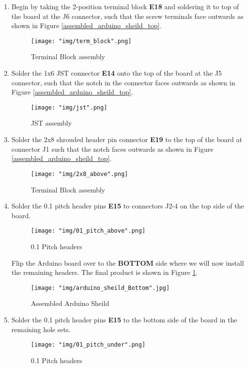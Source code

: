 \documentclass[12pt]{article}
\begin{document}
\begin{enumerate}

	\item Begin by taking the 2-position terminal block \textbf{E18} and soldering it to top of the board at the J6 connector, such that the screw terminals face outwards as shown in Figure \ref{assembled_arduino_sheild_top}. 


\begin{figure}[H]
	\centering
	\texttt{[image: "img/term\_block".png]}
	\caption{Terminal Block assembly}
\end{figure}


	\item Solder the 1x6 JST connector \textbf{E14} onto the top of the board at the J5 connector, such that the notch in the connector faces outwards as shown in Figure \ref{assembled_arduino_sheild_top}.

\begin{figure}[H]
	\centering
	\texttt{[image: "img/jst".png]}
	\caption{JST assembly}
\end{figure}

	\item Solder the 2x8 shrouded header pin connector \textbf{E19} to the top of the board at connector J1 such that the notch faces outwards as shown in Figure \ref{assembled_arduino_sheild_top}.

\begin{figure}[H]
	\centering
	\texttt{[image: "img/2x8\_above".png]}
	\caption{Terminal Block assembly}
\end{figure}

	\item Solder the 0.1 pitch header pins \textbf{E15} to connectors J2-4 on the top side of the board. 

\begin{figure}[H]
	\centering
	\texttt{[image: "img/01\_pitch\_above".png]}
	\caption{0.1 Pitch headers}
\end{figure}

Flip the Arduino board over to the \textbf{BOTTOM} side where we will now install the remaining headers. The final product is shown in Figure \ref{assembled_arduino_sheild_bottom}.

\begin{figure}[H]
  \centering
  \begin{minipage}[b]{0.75\textwidth}
    \texttt{[image: "img/arduino\_sheild\_Bottom".jpg]}
  \end{minipage}
  \caption{Assembled Arduino Sheild}
  \label{assembled_arduino_sheild_bottom}
\end{figure}

	\item Solder the 0.1 pitch header pins \textbf{E15} to the bottom side of the board in the remaining hole sets.

\begin{figure}[H]
	\centering
	\texttt{[image: "img/01\_pitch\_under".png]}
	\caption{0.1 Pitch headers}
\end{figure}

\end{enumerate}
\end{document}
